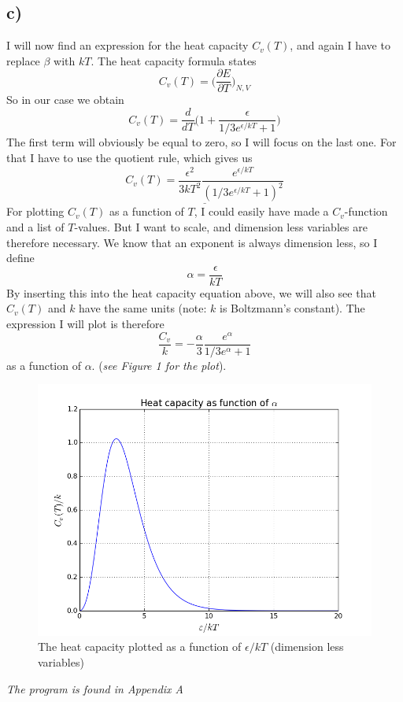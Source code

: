 \documentclass{scrartcl}
\begin{document}
\subsection*{c)}
I will now find an expression for the heat capacity $C_v(T)$, and again I have to replace $\beta$ with $kT$. The heat capacity formula states
\begin{equation}
C_v(T)=\bigg(\frac{\partial E}{\partial T}\bigg)_{N,V}
\end{equation}
So in our case we obtain
$$C_v(T)=\frac{d}{dT}\bigg(1+\frac{\epsilon}{1/3e^{\epsilon/kT}+1}\bigg)$$
The first term will obviously be equal to zero, so I will focus on the last one. For that I have to use the quotient rule, which gives us
$$\underline{C_v(T)=\frac{\epsilon^2}{3kT^2}\frac{e^{\epsilon/kT}}{(1/3e^{\epsilon/kT}+1)^2}}$$
For plotting $C_v(T)$ as a function of $T$, I could easily have made a $C_v$-function and a list of $T$-values. But I want to scale, and dimension less variables are therefore necessary. We know that an exponent is always dimension less, so I define 
$$\alpha=\frac{\epsilon}{kT}$$
By inserting this into the heat capacity equation above, we will also see that $C_v(T)$ and $k$ have the same units (note: $k$ is Boltzmann's constant). The expression I will plot is therefore 
\begin{equation}
\frac{C_v}{k}=-\frac{\alpha}{3}\frac{e^\alpha}{1/3e^\alpha+1}
\end{equation}
as a function of $\alpha$. (\textit{see Figure 1 for the plot}).\par\vspace{3mm}
\begin{figure}[!htbp]
\centering
\includegraphics[width=120mm]{oblig2_1.png}
\caption{The heat capacity plotted as a function of $\epsilon/kT$ (dimension less variables) \label{overflow}}
\end{figure}
\textit{The program is found in Appendix A}
\end{document}
